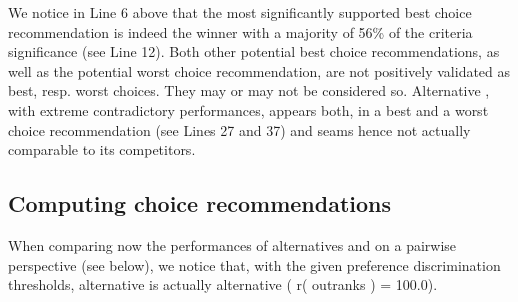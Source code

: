 \documentclass[a4paper,12pt,english]{sphinxhowto}
\begin{document}
We notice in Line 6 above that the most significantly supported best
choice recommendation is indeed the  winner  with a
majority of 56\% of the criteria significance (see Line 12). Both other
potential best choice recommendations, as well as the potential worst
choice recommendation, are not positively validated as best,
resp. worst choices. They may or may not be considered so. Alternative , with extreme contradictory performances, appears both, in a best and a worst choice recommendation (see Lines 27 and 37) and seams hence not actually comparable to its competitors.


\subsection{Computing  choice recommendations}
\label{\detokenize{tutorial:computing-strict-best-choice-recommendations}}
When comparing now the performances of alternatives  and  on a
pairwise perspective (see below), we notice that, with the given preference discrimination thresholds, alternative  is actually   alternative  ( r( outranks ) = 100.0).

\begin{sphinxVerbatim}[commandchars=\\\{\},numbers=left,firstnumber=1,stepnumber=1]
\end{sphinxVerbatim}
\end{document}
